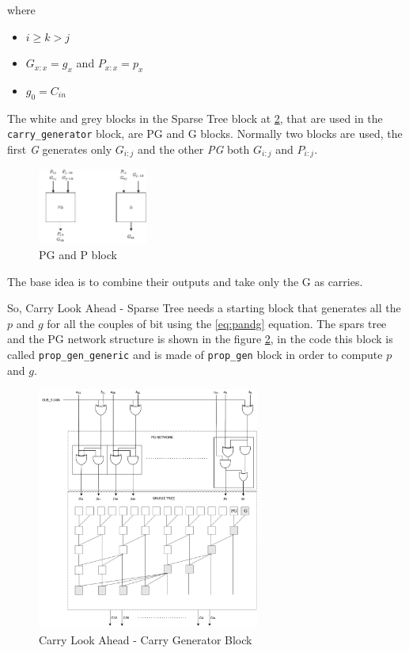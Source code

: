\begin{itemize}
    where
    \begin{itemize}
        \itemsep0sp
        \item $i \ge k > j$
        \item $G_{x:x} = g_x$ and $P_{x:x} = p_x$
        \item $g_0 = C_{in}$
    \end{itemize}
    The white and grey blocks in the Sparse Tree block at \ref{fig:pg_network}, that are used in the \texttt{carry\_generator} block, are PG and G blocks.
    Normally two blocks are used, the first \textit{G} generates only $G_{i:j}$ and the other \textit{PG} both $G_{i:j}$ and $P_{i:j}$.
    \begin{figure}[h]
        \centering
        \includegraphics[width=0.32\textwidth]{chapters/5_ExecuteStage/images/PG_and_G.pdf}
        \caption{PG and P block}
        \label{fig:PG_and_G}
    \end{figure}
    The base idea is to combine their outputs and take only the G as carries.
\end{itemize}
So, Carry Look Ahead - Sparse Tree needs a starting block that generates all the $p$ and $g$ for all the couples of bit using the \ref{eq:pandg} equation. The spars tree and the PG network structure is shown in the figure \ref{fig:pg_network}, in the code this block is called \texttt{prop\_gen\_generic} and is made of \texttt{prop\_gen} block in order to compute $p$ and $g$.
\begin{figure}[H]
    \centering
    \includegraphics[width=0.65\textwidth]{chapters/5_ExecuteStage/images/CLA.pdf}
    \caption{Carry Look Ahead - Carry Generator Block}
    \label{fig:pg_network}
\end{figure}
